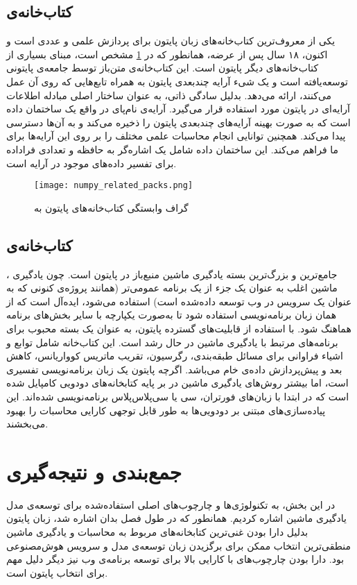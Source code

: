 \subsection{کتاب‌خانه‌ی }
 یکی از معروف‌ترین کتاب‌خانه‌های زبان پایتون برای پردازش علمی و عددی است و اکنون، ۱۸ سال پس از عرضه، همانطور که در \cref{fig:numpy_related_packs}\cite{van2011numpy} مشخص است، مبنای بسیاری از کتاب‌خانه‌های دیگر پایتون است. این کتاب‌خانه‌ی متن‌باز توسط جامعه‌ی پایتونی توسعه‌یافته است و یک شیء آرایه چندبعدی پایتون به همراه تابع‌هایی که روی آن عمل می‌کنند، ارائه می‌دهد.  بدلیل سادگی ذاتی، به عنوان ساختار اصلی مبادله اطلاعات آرایه‌ای در پایتون مورد استفاده قرار می‌گیرد\cite{harris2020array}. آرایه‌ی نام‌پای در واقع یک ساختمان داده است که به صورت بهینه آرایه‌های چند‌بعدی پایتون را ذخیره می‌کند و به آن‌ها دسترسی پیدا می‌کند. همچنین توانایی انجام محاسبات علمی مختلف را بر روی این آرایه‌ها برای ما فراهم می‌کند. این ساختمان داده شامل یک اشاره‌گر به حافظه و تعدادی فراداده برای تفسیر داده‌های موجود در آرایه است\cite{harris2020array, van2011numpy}.

\begin{figure}[!h]
\centerline{\texttt{[image: numpy\_related\_packs.png]}}
\caption{گراف وابستگی کتاب‌خانه‌های پایتون به \cite{van2011numpy}}
\label{fig:numpy_related_packs}
\end{figure}

\subsection{کتاب‌خانه‌ی } 
، جامع‌ترین و بزرگ‌ترین بسته یادگیری ماشین منبع‌باز در پایتون است. چون یادگیری ماشین اغلب به عنوان یک جزء از یک برنامه عمومی‌تر (همانند پروژه‌ی کنونی که به عنوان یک سرویس در وب توسعه داده‌شده است) استفاده می‌شود، ایده‌آل است که از همان زبان برنامه‌نویسی استفاده شود تا به‌صورت یکپارچه با سایر بخش‌های برنامه هماهنگ شود. با استفاده از قابلیت‌های گسترده پایتون،  به عنوان یک بسته محبوب برای برنامه‌های مرتبط با یادگیری ماشین در حال رشد است\cite{hao2019machine}. این کتاب‌خانه شامل توابع و اشیاء فراوانی برای مسائل طبقه‌بندی، رگرسیون، تقریب ماتریس کوواریانس، کاهش بعد و پیش‌پردازش داده‌ی خام می‌باشد\cite{kramer2016scikit}. اگرچه پایتون یک زبان برنامه‌نویسی تفسیری است، اما بیشتر روش‌های یادگیری ماشین در  بر پایه کتابخانه‌های دودویی کامپایل شده است که در ابتدا با زبان‌های فورتران، سی یا سی‌پلاس‌پلاس برنامه‌نویسی شده‌اند. این پیاده‌سازی‌های مبتنی بر دودویی‌ها به طور قابل توجهی کارایی محاسبات را بهبود می‌بخشند\cite{hao2019machine, kramer2016scikit}.

\section{جمع‌بندی و نتیجه‌گیری}
در این بخش، به تکنولوژی‌ها و چارچوب‌های اصلی استفاده‌شده برای توسعه‌ی مدل یادگیری ماشین اشاره کردیم. همانطور که در طول فصل بدان اشاره شد، زبان پایتون بدلیل دارا بودن غنی‌ترین کتابخانه‌های مربوط به محاسبات و یادگیری ماشین منطقی‌ترین انتخاب ممکن برای برگزیدن زبان توسعه‌ی مدل و سرویس هوش‌مصنوعی بود. دارا بودن چارچوب‌های با کارایی بالا برای توسعه برنامه‌ی وب نیز دیگر دلیل مهم برای انتخاب پایتون است.  